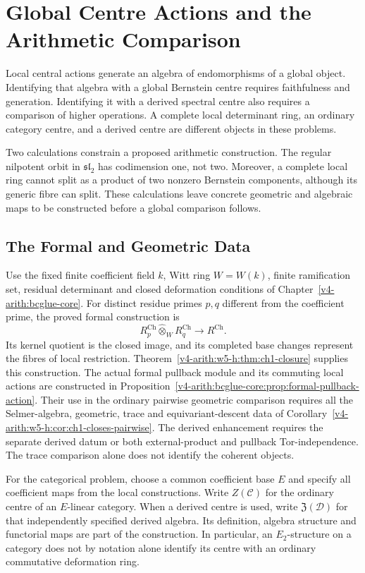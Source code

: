 \chapter{Global Centre Actions and the Arithmetic Comparison}
\label{v4-arith:w6-g:chapter}

Local central actions generate an algebra of endomorphisms of a
global object. Identifying that algebra with a global Bernstein
centre requires faithfulness and generation. Identifying it with a
derived spectral centre also requires a comparison of higher
operations. A complete local determinant ring, an ordinary category
centre, and a derived centre are different objects in these problems.

Two calculations constrain a proposed arithmetic construction.
The regular nilpotent orbit in $\mathfrak{sl}_2$ has codimension
one, not two. Moreover, a complete local ring cannot split as a
product of two nonzero Bernstein components, although its generic
fibre can split. These calculations leave concrete geometric and
algebraic maps to be constructed before a global comparison follows.

\section{The Formal and Geometric Data}
\label{v4-arith:w6-g:domain}

Use the fixed finite coefficient field $k$, Witt ring $W=W(k)$,
finite ramification set, residual determinant and closed deformation
conditions of Chapter~\ref{v4-arith:bcglue-core}.
For distinct residue primes $p,q$ different from the coefficient
prime, the proved formal construction is
\[
 R_p^{\mathrm{Ch}}\widehat\otimes_W R_q^{\mathrm{Ch}}
 \longrightarrow R^{\mathrm{Ch}}.
\]
Its kernel quotient is the closed image, and its completed base
changes represent the fibres of local restriction.
Theorem~\ref{v4-arith:w5-h:thm:ch1-closure} supplies this construction.
The actual formal pullback module and its commuting local actions
are constructed in
Proposition~\ref{v4-arith:bcglue-core:prop:formal-pullback-action}.
Their use in the ordinary pairwise geometric comparison requires
all the Selmer-algebra, geometric, trace and equivariant-descent data
of Corollary~\ref{v4-arith:w5-h:cor:ch1-closes-pairwise}.
The derived enhancement requires the separate derived datum or
both external-product and pullback Tor-independence.
The trace comparison alone does not identify the coherent objects.

For the categorical problem, choose a common coefficient base $E$
and specify all coefficient maps from the local constructions.
Write $Z(\mathcal C)$ for the ordinary centre of an $E$-linear
category. When a derived centre is used, write $\mathfrak Z(\mathcal D)$
for that independently specified derived algebra.
Its definition, algebra structure and functorial maps are part of
the construction. In particular, an $E_2$-structure on a category
does not by notation alone identify its centre with an ordinary
commutative deformation ring.

